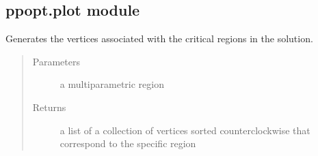 \documentclass[letterpaper,10pt,english]{sphinxmanual}
\begin{document}
\subsection{ppopt.plot module}
\label{\detokenize{ppopt:module-ppopt.plot}}\label{\detokenize{ppopt:ppopt-plot-module}}

\begin{fulllineitems}
\label{\detokenize{ppopt:ppopt.plot.gen_vertices}}
\sphinxAtStartPar
Generates the vertices associated with the critical regions in the solution.
\begin{quote}\begin{description}
\item[{Parameters}] \leavevmode
\sphinxAtStartPar
{} \textendash{} a multiparametric region

\item[{Returns}] \leavevmode
\sphinxAtStartPar
a list of a collection of vertices sorted counterclockwise that correspond to the specific region

\end{description}\end{quote}

\end{fulllineitems}

\end{document}
